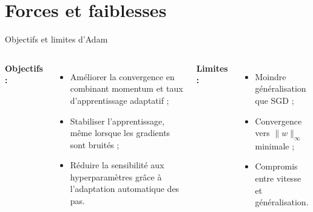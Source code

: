 \documentclass{beamer}
\begin{document}

\section{Forces et faiblesses}

\begin{frame}{Objectifs et limites d’Adam}

\begin{columns}[T]
\textbf{Objectifs :}
\begin{itemize}
  \item Améliorer la convergence en combinant momentum et taux d’apprentissage adaptatif ;
  \item Stabiliser l’apprentissage, même lorsque les gradients sont bruités ;
  \item Réduire la sensibilité aux hyperparamètres grâce à l’adaptation automatique des pas.
\end{itemize}

\textbf{Limites :}
\begin{itemize}
  \item Moindre généralisation que SGD \cite{wilson2017} ;
  \item Convergence vers $\|w\|_\infty$ minimale ;
  \item Compromis entre vitesse et généralisation.
\end{itemize}
\end{columns}

\end{frame}
\end{document}
